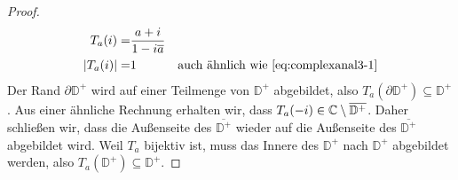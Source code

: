 \begin{proof}
\begin{align*}
	T_a(i)=&\frac{a+i}{1-i\overline{a}}\\
	|T_a(i)|=& 1 & \text{auch ähnlich wie \eqref{eq:complexanal3-1}}
\end{align*}
Der Rand $\partial \mathbb{D}^+$ wird auf einer Teilmenge von $\mathbb{D}^+$ abgebildet, also $T_a(\partial\mathbb{D}^+)\subseteq \mathbb{D}^+$. Aus einer ähnliche Rechnung erhalten wir, dass $T_a(-i)\in \mathbb{C}\setminus \overline{\mathbb{D}^+}$. Daher schließen wir, dass die Außenseite des $\overline{\mathbb{D}^+}$ wieder auf die Außenseite des $\overline{\mathbb{D}^+}$ abgebildet wird. Weil $T_a$ bijektiv ist, muss das Innere des $\mathbb{D}^+$ nach $\mathbb{D}^+$ abgebildet werden, also $T_a(\mathbb{D}^+)\subseteq \mathbb{D}^+$.
\end{proof}
